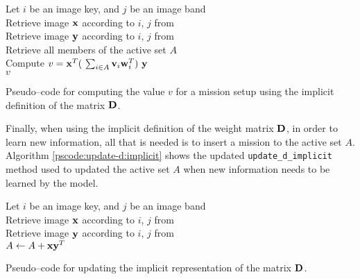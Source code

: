 \vspace{0.4cm}
\begin{algorithm}[H]
    \SetAlgoLined
         {
            Let $i$ be an image key, and $j$ be an image band \\
            Retrieve image $\boldsymbol{\mathbf{x}}$ according to $i$, $j$ from \usno \\
            Retrieve image $\boldsymbol{\mathbf{y}}$ according to $i$, $j$ from \panstarrs \\
            Retrieve all members of the active set $A$ \\
            Compute $v = \boldsymbol{\mathbf{x}}^T (\ \sum_{i \in A} \boldsymbol{\mathbf{v}}_i \boldsymbol{\mathbf{w}}_i^T )\ \boldsymbol{\mathbf{y}}$ \\
            \Return $v$
        }
    \caption{Pseudo--code for computing the value $v$ for a mission setup using the implicit definition of the matrix $\boldsymbol{\mathbf{D}}$.}
    \label{pscode:compute-v:implicit}
\end{algorithm}
\vspace{0.4cm}

Finally, when using the implicit definition of the weight matrix $\boldsymbol{\mathbf{D}}$, in order to learn new information, all that is needed is to insert a mission to the active set $A$. Algorithm \ref{pscode:update-d:implicit} shows the updated \texttt{update\_d\_implicit} method used to updated the active set $A$ when new information needs to be learned by the model.

\vspace{0.4cm}
\begin{algorithm}[H]
    \SetAlgoLined
         {
            Let $i$ be an image key, and $j$ be an image band \\
            Retrieve image $\boldsymbol{\mathbf{x}}$ according to $i$, $j$ from \usno \\
            Retrieve image $\boldsymbol{\mathbf{y}}$ according to $i$, $j$ from \panstarrs \\
            $A \gets A + \boldsymbol{\mathbf{x}}\boldsymbol{\mathbf{y}}^T$ \\
        }
    \caption{Pseudo--code for updating the implicit representation of the matrix $\boldsymbol{\mathbf{D}}$.}
    \label{pscode:update-d:implicit}
\end{algorithm}
\vspace{0.4cm}
